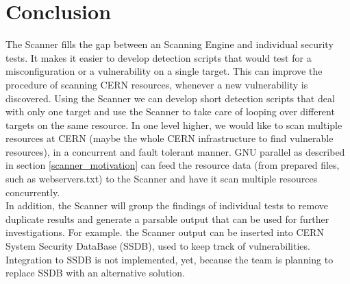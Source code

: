 \section{Conclusion}
The Scanner fills the gap between an Scanning Engine and individual security tests. It makes it easier to develop detection scripts that would test for a misconfiguration or a vulnerability on a single target. This can improve the procedure of scanning CERN resources, whenever a new vulnerability is discovered. Using the Scanner we can develop short detection scripts that deal with only one target and use the Scanner to take care of looping over different targets on the same resource. In one level higher, we would like to scan multiple resources at CERN (maybe the whole CERN infrastructure to find vulnerable resources), in a concurrent and fault tolerant manner. GNU parallel as described in section \ref{scanner_motivation} can feed the resource data (from prepared files, such as webservers.txt) to the Scanner and have it scan multiple resources concurrently.
\\
In addition, the Scanner will group the findings of individual tests to remove duplicate results and generate a parsable output that can be used for further investigations. For example. the Scanner output can be inserted into CERN System Security DataBase (SSDB), used to keep track of vulnerabilities. Integration to SSDB is not implemented, yet, because the team is planning to replace SSDB with an alternative solution. 

